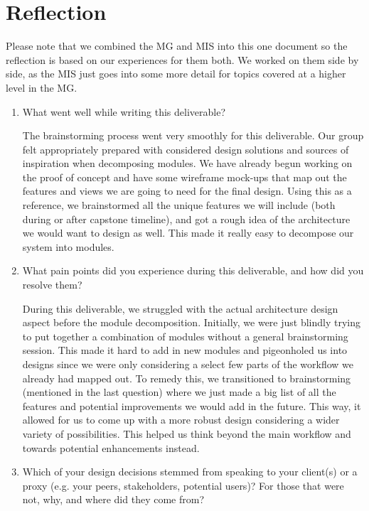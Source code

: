 \documentclass[12pt, titlepage]{article}
\begin{document}
\newpage{}

\section{Reflection}


Please note that we combined the MG and MIS into this one document so the reflection is based on our experiences for them both. We worked on them side by side, as the MIS just goes into some more detail for topics covered at a higher level in the MG. 

\begin{enumerate}
  \item What went well while writing this deliverable?

        The brainstorming process went very smoothly for this deliverable. Our group felt appropriately prepared with considered design solutions and sources of inspiration when decomposing modules. We have already begun working on the proof of concept and have some wireframe mock-ups that map out the features and views we are going to need for the final design. Using this as a reference, we brainstormed all the unique features we will include (both during or after capstone timeline), and got a rough idea of the architecture we would want to design as well. This made it really easy to decompose our system into modules. 

  \item What pain points did you experience during this deliverable, and how
    did you resolve them?

    During this deliverable, we struggled with the actual architecture design aspect before the module decomposition. Initially, we were just blindly trying to put together a combination of modules without a general brainstorming session. This made it hard to add in new modules and pigeonholed us into designs since we were only considering a select few parts of the workflow we already had mapped out. To remedy this, we transitioned to brainstorming (mentioned in the last question) where we just made a big list of all the features and potential improvements we would add in the future. This way, it allowed for us to come up with a more robust design considering a wider variety of possibilities. This helped us think beyond the main workflow and towards potential enhancements instead. 

  \item Which of your design decisions stemmed from speaking to your client(s)
  or a proxy (e.g. your peers, stakeholders, potential users)? For those that
  were not, why, and where did they come from?


\end{enumerate}
\end{document}
